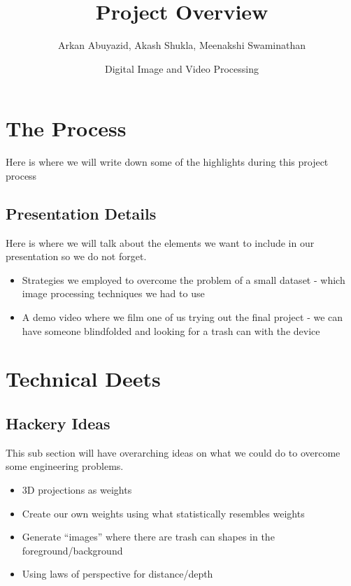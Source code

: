 \documentclass[12pt,letterpaper]{article}
\title{Project Overview}
\author{Arkan Abuyazid, Akash Shukla, Meenakshi Swaminathan}
\date{Digital Image and Video Processing}
\begin{document}
\maketitle

\section*{The Process}
Here is where we will write down some of the highlights during this project process
\subsection*{Presentation Details}
Here is where we will talk about the elements we want to include in our presentation so we do not forget.
\begin{itemize}
    \item Strategies we employed to overcome the problem of a small dataset - which image processing techniques we had to use
    \item A demo video where we film one of us trying out the final project - we can have someone blindfolded and looking for a trash can with the device
\end{itemize}
\section*{Technical Deets}
\subsection*{Hackery Ideas}
This sub section will have overarching ideas on what we could do to overcome some engineering problems.
\begin{itemize}
    \item 3D projections as weights
    \item Create our own weights using what statistically resembles weights
    \item Generate “images” where there are trash can shapes in the foreground/background

    \item Using laws of perspective for distance/depth
\end{itemize}
\end{document}
